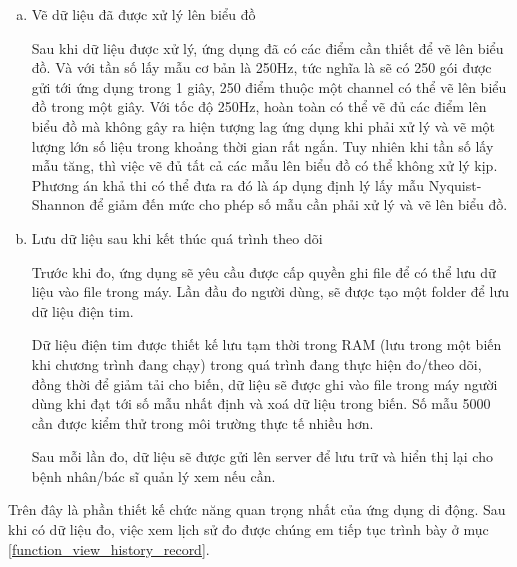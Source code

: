 \begin{enumerate} [a)]
    Nhìn vào trong hình \ref{channel_01_calculation}, bước (1) sẽ thực hiện công đoạn chuyển 3 bytes sang số thập phân,
    bước (2) kiểm tra điều kiện khi so sánh với \(2^{23}\), bước (3) do giá trị ở bước (1) lớn hơn \(2^{23}\) nên thực hiện
    phép trừ để trả về đúng dấu, nếu giá trị bước (1) nhỏ hơn \(2^{23}\) thì giữ nguyên giá trị mà không trừ.
    bước (4) thực hiện công thức quy đổi ra điện áp theo công thức tính được cung cấp trong Table 9, ADS 1299
    Datasheet.

    Dữ liệu output trả ra chính là giá trị điện áp của channel 1 dùng để vẽ lên biểu đồ. Lần lượt thực hiện với các channel
    còn lại, kết quả thu được sẽ là 4 giá trị điện áp với từng channel tính toán thành công trong một gói nhận từ thiết bị.
    Nói cách khác, một gói dữ liệu mà ứng dụng nhận được, sau khi qua xử lý sẽ trả ra các giá trị điện áp tương ứng với các
    channel, mỗi giá trị sẽ là một điểm trên biểu đồ điện tim.

    Đối với gói dữ liệu gửi từ thiết bị đo điện tim, sẽ phức tạp hơn một chút khi phải chia nhỏ dữ liệu trong trường Data,
    thành từng cụm 12 bytes và xử lý 12 bytes y hệt như công thức xử lý ở trên. 

  \item Vẽ dữ liệu đã được xử lý lên biểu đồ

    Sau khi dữ liệu được xử lý, ứng dụng đã có các điểm cần thiết để vẽ lên biểu đồ. Và với tần số lấy mẫu cơ bản là 250Hz, 
    tức nghĩa là sẽ có 250 gói được gửi tới ứng dụng trong 1 giây, 250 điểm thuộc một channel có thể vẽ lên biểu đồ trong một giây.
    Với tốc độ 250Hz, hoàn toàn có thể vẽ đủ các điểm lên biểu đồ mà không gây ra hiện tượng lag ứng dụng khi phải xử lý và vẽ một
    lượng lớn số liệu trong khoảng thời gian rất ngắn. Tuy nhiên khi tần số lấy mẫu tăng, thì việc vẽ đủ tất cả các mẫu lên
    biểu đồ có thể không xử lý kịp. Phương án khả thi có thể đưa ra đó là áp dụng định lý lấy mẫu Nyquist-Shannon để giảm
    đến mức cho phép số mẫu cần phải xử lý và vẽ lên biểu đồ.

  \item Lưu dữ liệu sau khi kết thúc quá trình theo dõi
    
    Trước khi đo, ứng dụng sẽ yêu cầu được cấp quyền ghi file để có thể lưu dữ liệu vào file trong máy. Lần đầu đo người dùng,
    sẽ được tạo một folder để lưu dữ liệu điện tim.
  
    Dữ liệu điện tim được thiết kế lưu tạm thời trong RAM (lưu trong một biến khi chương trình đang chạy) trong quá trình 
    đang thực hiện đo/theo dõi, đồng thời để giảm tải cho biến, dữ liệu sẽ được ghi vào file trong máy người dùng khi đạt tới số mẫu nhất định và xoá dữ liệu trong biến.
    Số mẫu 5000 cần được kiểm thử trong môi trường thực tế nhiều hơn.

    Sau mỗi lần đo, dữ liệu sẽ được gửi lên server để lưu trữ và hiển thị lại cho bệnh nhân/bác sĩ quản lý xem nếu cần.

\end{enumerate}
Trên đây là phần thiết kế chức năng quan trọng nhất của ứng dụng di động. Sau khi có dữ liệu đo, việc xem lịch sử đo được chúng em 
tiếp tục trình bày ở mục \ref{function_view_history_record}.

